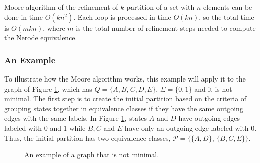 {%

Moore algorithm of the refinement of $k$ partition of a set with $n$ elements can be done in time $O(kn^2)$. Each loop is processed in time $O(kn)$, so the total time is $O(m kn)$, where $m$ is the total number of refinement steps needed to compute the Nerode equivalence.

\subsubsection{An Example}

To illustrate how the Moore algorithm works, this example will apply it to the graph of Figure \ref{fig:moore_ex}, which has $Q = \{A, B, C, D, E\}$, $\Sigma = \{0, 1\}$ and it is not minimal. The first step is to create the initial partition based on the criteria of grouping states together in equivalence classes if they have the same outgoing edges with the same labels. In Figure \ref{fig:moore_ex}, states $A$ and $D$ have outgoing edges labeled with 0 and 1 while $B, C$ and $E$ have only an outgoing edge labeled with 0. Thus, the initial partition has two equivalence classes, $\mathcal{P} = \{\{A,D\}$,  $\{B,C,E\}\}$.

\begin{figure}
\centering
{}
\caption{An example of a graph that is not minimal.\label{fig:moore_ex}}
\end{figure}

}
